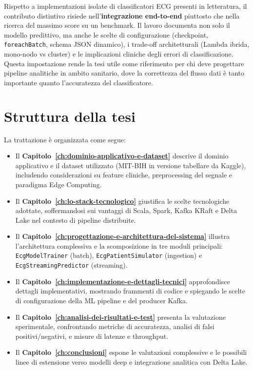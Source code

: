 Rispetto a implementazioni isolate di classificatori ECG presenti in letteratura, il contributo distintivo risiede nell'\textbf{integrazione end-to-end} piuttosto che nella ricerca del massimo score su un benchmark.
Il lavoro documenta non solo il modello predittivo, ma anche le scelte di configurazione (checkpoint, \texttt{foreachBatch}, schema JSON dinamico), i trade-off architetturali (Lambda ibrida, mono-nodo vs cluster) e le implicazioni cliniche degli errori di classificazione.
Questa impostazione rende la tesi utile come riferimento per chi deve progettare pipeline analitiche in ambito sanitario, dove la correttezza del flusso dati è tanto importante quanto l'accuratezza del classificatore.

\section{Struttura della tesi}\label{sec:struttura-della-tesi}
La trattazione è organizzata come segue:
\begin{itemize}
  \item Il \textbf{Capitolo~\ref{ch:dominio-applicativo-e-dataset}} descrive il dominio applicativo e il dataset utilizzato (MIT-BIH in versione tabellare da Kaggle), includendo considerazioni su feature cliniche, preprocessing del segnale e paradigma Edge Computing.
  \item Il \textbf{Capitolo~\ref{ch:lo-stack-tecnologico}} giustifica le scelte tecnologiche adottate, soffermandosi sui vantaggi di Scala, Spark, Kafka KRaft e Delta Lake nel contesto di pipeline distribuite.
  \item Il \textbf{Capitolo~\ref{ch:progettazione-e-architettura-del-sistema}} illustra l'architettura complessiva e la scomposizione in tre moduli principali: \texttt{EcgModelTrainer} (batch), \texttt{EcgPatientSimulator} (ingestion) e \texttt{EcgStreamingPredictor} (streaming).
  \item Il \textbf{Capitolo~\ref{ch:implementazione-e-dettagli-tecnici}} approfondisce dettagli implementativi, mostrando frammenti di codice e spiegando le scelte di configurazione della ML pipeline e del producer Kafka.
  \item Il \textbf{Capitolo~\ref{ch:analisi-dei-risultati-e-test}} presenta la valutazione sperimentale, confrontando metriche di accuratezza, analisi di falsi positivi/negativi, e misure di latenze e throughput.
  \item Il \textbf{Capitolo~\ref{ch:conclusioni}} espone le valutazioni complessive e le possibili linee di estensione verso modelli deep e integrazione analitica con Delta Lake.
\end{itemize}

